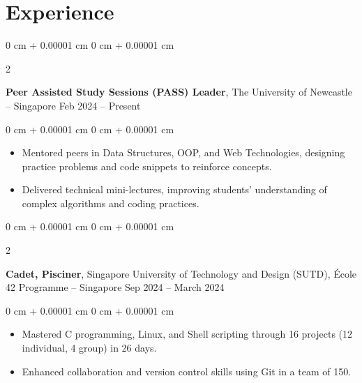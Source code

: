 \documentclass[10pt, letterpaper]{article}
\newenvironment{highlights}{
    \begin{itemize}[
        topsep=0.10 cm,
        parsep=0.10 cm,
        partopsep=0pt,
        itemsep=0pt,
        leftmargin=0 cm + 10pt
    ]
}{
    \end{itemize}
} %
\newenvironment{onecolentry}{
    \begin{adjustwidth}{
        0 cm + 0.00001 cm
    }{
        0 cm + 0.00001 cm
    }
}{
    \end{adjustwidth}
} %
\newenvironment{twocolentry}[2][]{
    \onecolentry
    \def\secondColumn{#2}
    \setcolumnwidth{\fill, 4.5 cm}
    \begin{paracol}{2}
}{
    \switchcolumn \raggedleft \secondColumn
    \end{paracol}
    \endonecolentry
} %
\begin{document}
        \section{Experience}        
                \begin{twocolentry}{
                    Feb 2024 – Present
                }
                    \textbf{Peer Assisted Study Sessions (PASS) Leader}, The University of Newcastle -- Singapore \end{twocolentry}
                \vspace{0.10 cm}
                \begin{onecolentry}
                    \begin{highlights}
                        \item Mentored peers in Data Structures, OOP, and Web Technologies, designing practice problems and code snippets to reinforce concepts.
                        \item Delivered technical mini-lectures, improving students’ understanding of complex algorithms and coding practices.
                    \end{highlights}
                \end{onecolentry}
                
                \vspace{0.2 cm}
                
                \vspace{0.2 cm}
                
                \begin{twocolentry}{
                    Sep 2024 – March 2024
                }
                    \textbf{Cadet, Pisciner}, Singapore University of Technology and Design (SUTD), École 42 Programme -- Singapore\end{twocolentry}
                \vspace{0.10 cm}
                \begin{onecolentry}
                    \begin{highlights}
                        \item Mastered C programming, Linux, and Shell scripting through 16 projects (12 individual, 4 group) in 26 days.
                        \item Enhanced collaboration and version control skills using Git in a team of 150.
                    \end{highlights}
                \end{onecolentry}
        
\end{document}
